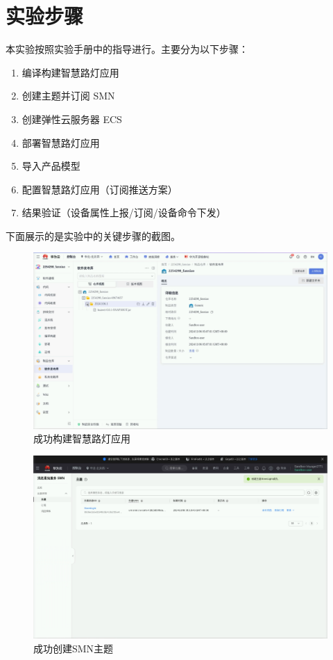 \section{实验步骤}
本实验按照实验手册中的指导进行。主要分为以下步骤：
\begin{enumerate}
    \item 编译构建智慧路灯应用
    \item 创建主题并订阅 SMN
    \item 创建弹性云服务器 ECS
    \item 部署智慧路灯应用
    \item 导入产品模型
    \item 配置智慧路灯应用（订阅推送方案）
    \item 结果验证（设备属性上报/订阅/设备命令下发）
\end{enumerate}

下面展示的是实验中的关键步骤的截图。

\begin{figure}[!htbp]
\centering
\includegraphics[width=\textwidth]{figures/序列 01.00_00_12_39.Still003.png}
\caption{成功构建智慧路灯应用}\label{成功构建智慧路灯应用}
\end{figure}

\begin{figure}[!htbp]
\centering
\includegraphics[width=\textwidth]{figures/序列 01.00_01_23_17.Still004.png}
\caption{成功创建SMN主题}\label{成功创建SMN主题}
\end{figure}

